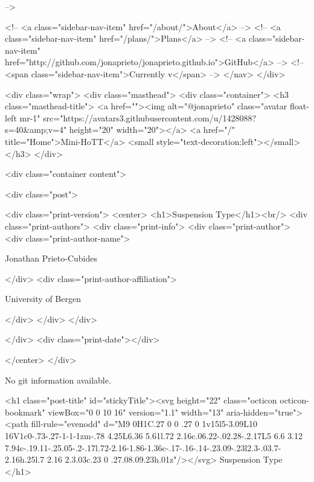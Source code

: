       
     -->

    <!-- <a class="sidebar-nav-item" href="/about/">About</a> -->
    <!-- <a class="sidebar-nav-item" href="/plans/">Plans</a> -->
    <!-- <a class="sidebar-nav-item" href="http://github.com/jonaprieto/jonaprieto.github.io">GitHub</a> -->
    <!-- <span class="sidebar-nav-item">Currently v</span> -->
  </nav>
</div>

    <div class="wrap">
      <div class="masthead">
        <div class="container">
          <h3 class="masthead-title">
            <a href=""><img alt="@jonaprieto" class="avatar float-left mr-1" src="https://avatars3.githubusercontent.com/u/1428088?s=40&amp;v=4" height="20" width="20"></a>
            <a href="/" title="Home">Mini-HoTT</a>
            <small style="text-decoration:left"></small>
          </h3>
        </div>
      
      <div class="container content">
        







<div class="post">

  <div class="print-version">
    <center>
      <h1>Suspension Type</h1><br/>
        <div class="print-authors">
          <div class="print-info">
            <div class="print-author">
              <div class="print-author-name">
                
                  Jonathan Prieto-Cubides
                
              </div>
              <div class="print-author-affiliation">
                
                  University of Bergen
                
                </div>
            </div>
          </div>
          
          
        </div>
        <div class="print-date"></div>
        
        
    </center>
  </div>

  
  No git information available.
  
  <h1 class="post-title" id="stickyTitle"><svg height="22" class="octicon octicon-bookmark" viewBox="0 0 10 16" version="1.1" width="13" aria-hidden="true"><path fill-rule="evenodd" d="M9 0H1C.27 0 0 .27 0 1v15l5-3.09L10 16V1c0-.73-.27-1-1-1zm-.78 4.25L6.36 5.61l.72 2.16c.06.22-.02.28-.2.17L5 6.6 3.12 7.94c-.19.11-.25.05-.2-.17l.72-2.16-1.86-1.36c-.17-.16-.14-.23.09-.23l2.3-.03.7-2.16h.25l.7 2.16 2.3.03c.23 0 .27.08.09.23h.01z"/></svg> Suspension Type
  </h1>

